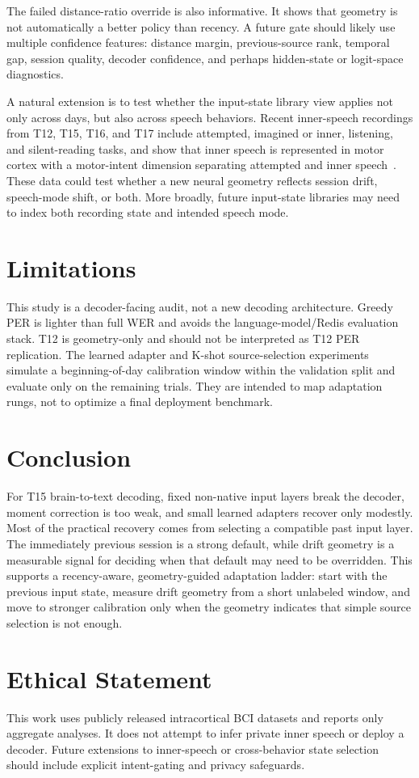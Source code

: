 \documentclass{article}
\begin{document}
The failed distance-ratio override is also informative. It shows that geometry is not automatically a better policy than recency. A future gate should likely use multiple confidence features: distance margin, previous-source rank, temporal gap, session quality, decoder confidence, and perhaps hidden-state or logit-space diagnostics.

A natural extension is to test whether the input-state library view applies not only across days, but also across speech behaviors. Recent inner-speech recordings from T12, T15, T16, and T17 include attempted, imagined or inner, listening, and silent-reading tasks, and show that inner speech is represented in motor cortex with a motor-intent dimension separating attempted and inner speech~\cite{kunz2025inner}. These data could test whether a new neural geometry reflects session drift, speech-mode shift, or both. More broadly, future input-state libraries may need to index both recording state and intended speech mode.

\section{Limitations}
This study is a decoder-facing audit, not a new decoding architecture. Greedy PER is lighter than full WER and avoids the language-model/Redis evaluation stack. T12 is geometry-only and should not be interpreted as T12 PER replication. The learned adapter and K-shot source-selection experiments simulate a beginning-of-day calibration window within the validation split and evaluate only on the remaining trials. They are intended to map adaptation rungs, not to optimize a final deployment benchmark.

\section{Conclusion}
For T15 brain-to-text decoding, fixed non-native input layers break the decoder, moment correction is too weak, and small learned adapters recover only modestly. Most of the practical recovery comes from selecting a compatible past input layer. The immediately previous session is a strong default, while drift geometry is a measurable signal for deciding when that default may need to be overridden. This supports a recency-aware, geometry-guided adaptation ladder: start with the previous input state, measure drift geometry from a short unlabeled window, and move to stronger calibration only when the geometry indicates that simple source selection is not enough.

\section*{Ethical Statement}
This work uses publicly released intracortical BCI datasets and reports only aggregate analyses. It does not attempt to infer private inner speech or deploy a decoder. Future extensions to inner-speech or cross-behavior state selection should include explicit intent-gating and privacy safeguards.



\end{document}
